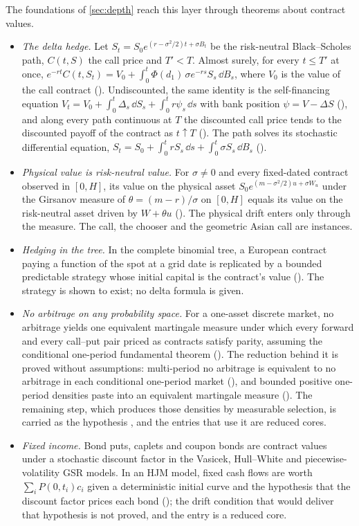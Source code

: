 \documentclass[11pt]{article}
\begin{document}
The foundations of \cref{sec:depth} reach this layer through theorems about contract values.
\begin{itemize}
\item \emph{The delta hedge.} Let $S_t=S_0e^{(r-\sigma^2/2)t+\sigma B_t}$ be the risk-neutral Black--Scholes path, $C(t,S)$
  the call price and $T'<T$. Almost surely, for every $t\le T'$ at once,
  $e^{-rt}C(t,S_t)=V_0+\int_0^t\Phi(d_1)\,\sigma e^{-rs}S_s\,\dd B_s$, where $V_0$ is the value of the call contract
  (). Undiscounted, the same identity is the self-financing equation
  $V_t=V_0+\int_0^t\Delta_s\,\dd S_s+\int_0^tr\psi_s\,\dd s$ with bank position $\psi=V-\Delta S$
  (), and along every path continuous at $T$ the discounted call price tends to the
  discounted payoff of the contract as $t\uparrow T$ (). The path solves its
  stochastic differential equation, $S_t=S_0+\int_0^trS_s\,\dd s+\int_0^t\sigma S_s\,\dd B_s$ ().
\item \emph{Physical value is risk-neutral value.} For $\sigma\ne0$ and every fixed-dated contract observed in $[0,H]$, its
  value on the physical asset $S_0e^{(m-\sigma^2/2)u+\sigma W_u}$ under the Girsanov measure of $\theta=(m-r)/\sigma$ on $[0,H]$ equals its
  value on the risk-neutral asset driven by $W+\theta u$ (). The physical drift enters
  only through the measure. The call, the chooser and the geometric Asian call are instances.
\item \emph{Hedging in the tree.} In the complete binomial tree, a European contract paying a function of the spot at a
  grid date is replicated by a bounded predictable strategy whose initial capital is the contract's value
  (). The strategy is shown to exist; no delta formula is given.
\item \emph{No arbitrage on any probability space.} For a one-asset discrete market, no arbitrage yields one equivalent
  martingale measure under which every forward and every call--put pair priced as contracts satisfy parity, assuming the
  conditional one-period fundamental theorem (). The reduction behind it is proved without
  assumptions: multi-period no arbitrage is equivalent to no arbitrage in each conditional one-period market
  (), and bounded positive one-period densities paste into an equivalent martingale
  measure (). The remaining step, which produces those densities by measurable selection, is
  carried as the hypothesis , and the entries that use it are reduced cores.
\item \emph{Fixed income.} Bond puts, caplets and coupon bonds are contract values under a stochastic discount factor in
  the Vasicek, Hull--White and piecewise-volatility GSR models. In an HJM model, fixed cash flows are worth $\sum_iP(0,t_i)c_i$
  given a deterministic initial curve and the hypothesis that the discount factor prices each bond
  (); the drift condition that would deliver that hypothesis is not proved, and the entry is
  a reduced core.
\end{itemize}
\end{document}
